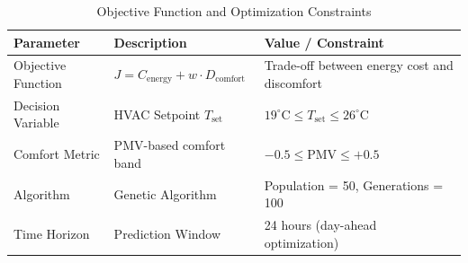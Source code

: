 \begin{table}[h]
\centering
\caption{Objective Function and Optimization Constraints}
\label{tab:optimization_constraints}
\begin{tabular}{lll}
\hline
Parameter & Description & Value / Constraint \\
\hline
Objective Function & $J = C_{\text{energy}} + w \cdot D_{\text{comfort}}$ & Trade-off between energy cost and discomfort \\
Decision Variable & HVAC Setpoint $T_{\text{set}}$ & $19^\circ\text{C} \le T_{\text{set}} \le 26^\circ\text{C}$ \\
Comfort Metric & PMV-based comfort band & $-0.5 \le \text{PMV} \le +0.5$ \\
Algorithm & Genetic Algorithm & Population = 50, Generations = 100 \\
Time Horizon & Prediction Window & 24 hours (day-ahead optimization) \\
\hline
\end{tabular}
\end{table}
